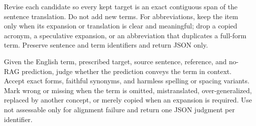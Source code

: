 \begin{tcolorbox}[
  colback=black!2,
  colframe=black!55!black,
  coltext=black,
  title={Stage 2 prompt: exact span and abbreviation consistency},
  fonttitle=\bfseries,
  boxrule=0.4pt]
\ttfamily\footnotesize
Revise each candidate so every kept target is an exact contiguous span of the sentence translation. Do not add new terms. For abbreviations, keep the item only when its expansion or translation is clear and meaningful; drop a copied acronym, a speculative expansion, or an abbreviation that duplicates a full-form term. Preserve sentence and term identifiers and return JSON only.
\end{tcolorbox}

\begin{tcolorbox}[
  colback=black!2,
  colframe=black!55!black,
  coltext=black,
  title={Stage 5 prompt: hard-term filtering},
  fonttitle=\bfseries,
  boxrule=0.4pt]
\ttfamily\footnotesize
Given the English term, prescribed target, source sentence, reference, and no-RAG prediction, judge whether the prediction conveys the term in context. Accept exact forms, faithful synonyms, and harmless spelling or spacing variants. Mark wrong or missing when the term is omitted, mistranslated, over-generalized, replaced by another concept, or merely copied when an expansion is required. Use not assessable only for alignment failure and return one JSON judgment per identifier.
\end{tcolorbox}

